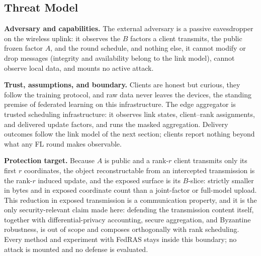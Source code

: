\documentclass[a4paper,fleqn]{cas-dc}
\begin{document}
\subsection{Threat Model}
\label{sec:threat}
\textbf{Adversary and capabilities.} The external adversary is a passive eavesdropper on the wireless uplink: it observes the $B$ factors a client transmits, the public frozen factor $A$, and the round schedule, and nothing else, it cannot modify or drop messages (integrity and availability belong to the link model), cannot observe local data, and mounts no active attack.
\par
\textbf{Trust, assumptions, and boundary.} Clients are honest but curious, they follow the training protocol, and raw data never leaves the devices, the standing premise of federated learning on this infrastructure. The edge aggregator is trusted scheduling infrastructure: it observes link states, client--rank assignments, and delivered update factors, and runs the masked aggregation. Delivery outcomes follow the link model of the next section; clients report nothing beyond what any FL round makes observable.
\par
\textbf{Protection target.} Because $A$ is public and a rank-$r$ client transmits only its first $r$ coordinates, the object reconstructable from an intercepted transmission is the rank-$r$ induced update, and the exposed surface is its $B$-slice: strictly smaller in bytes and in exposed coordinate count than a joint-factor or full-model upload. This reduction in exposed transmission is a communication property, and it is the only security-relevant claim made here: defending the transmission content itself, together with differential-privacy accounting, secure aggregation, and Byzantine robustness, is out of scope and composes orthogonally with rank scheduling. Every method and experiment with FedRAS stays inside this boundary; no attack is mounted and no defense is evaluated.
\par
\end{document}

